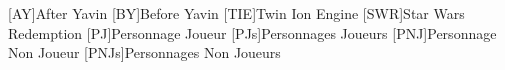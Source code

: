 [AY]{After Yavin}
[BY]{Before Yavin}
[TIE]{Twin Ion Engine}
[SWR]{Star Wars Redemption}
[PJ]{Personnage Joueur}
[PJs]{Personnages Joueurs}
[PNJ]{Personnage Non Joueur}
[PNJs]{Personnages Non Joueurs}
